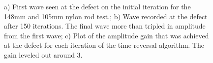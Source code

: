 \documentclass[11pt,letterpaper]{article}%
\begin{document}
\begin{figure}
   \caption[all]
   { \label{nylonExp1}
   a) First wave seen at the defect on the initial iteration for the 148mm and 105mm nylon rod test.; b) Wave recorded at the defect after 150 iterations. The final wave more than tripled in amplitude from the first wave; c) Plot of the amplitude gain that was achieved at the defect for each iteration of the time reversal algorithm. The gain leveled out around 3.
 }
\end{figure}

 \begin{figure}
\begin{subfigmatrix}{3}
\end{subfigmatrix}


\end{figure}
\end{document}
